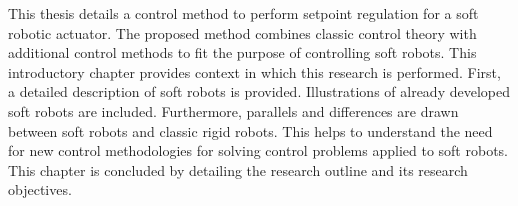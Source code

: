 This thesis details a control method to perform setpoint regulation for a soft robotic actuator. The proposed method combines classic control theory with additional control methods to fit the purpose of controlling soft robots. This introductory chapter provides context in which this research is performed. First, a detailed description of soft robots is provided. Illustrations of already developed soft robots are included. Furthermore, parallels and differences are drawn between soft robots and classic rigid robots. This helps to understand the need for new control methodologies for solving control problems applied to soft robots. This chapter is concluded by detailing the research outline and its research objectives.
